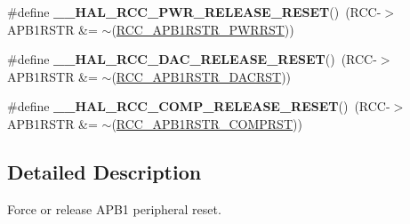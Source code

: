 \begin{DoxyCompactItemize}
\item 
\hypertarget{group___r_c_c___a_p_b1___force___release___reset_gaaa5a340d38d50e508243f48bbb47dd32}{\#define {\bfseries \-\_\-\-\_\-\-H\-A\-L\-\_\-\-R\-C\-C\-\_\-\-P\-W\-R\-\_\-\-R\-E\-L\-E\-A\-S\-E\-\_\-\-R\-E\-S\-E\-T}()~(R\-C\-C-\/$>$A\-P\-B1\-R\-S\-T\-R \&= $\sim$(\hyperlink{group___peripheral___registers___bits___definition_ga274d8cb48f0e89831efabea66d64af2a}{R\-C\-C\-\_\-\-A\-P\-B1\-R\-S\-T\-R\-\_\-\-P\-W\-R\-R\-S\-T}))}\label{group___r_c_c___a_p_b1___force___release___reset_gaaa5a340d38d50e508243f48bbb47dd32}

\item 
\hypertarget{group___r_c_c___a_p_b1___force___release___reset_ga1ac476b29c9395378bc16a7c4df08c7c}{\#define {\bfseries \-\_\-\-\_\-\-H\-A\-L\-\_\-\-R\-C\-C\-\_\-\-D\-A\-C\-\_\-\-R\-E\-L\-E\-A\-S\-E\-\_\-\-R\-E\-S\-E\-T}()~(R\-C\-C-\/$>$A\-P\-B1\-R\-S\-T\-R \&= $\sim$(\hyperlink{group___peripheral___registers___bits___definition_ga7fb9c125237cfe5b6436ca795e7f3564}{R\-C\-C\-\_\-\-A\-P\-B1\-R\-S\-T\-R\-\_\-\-D\-A\-C\-R\-S\-T}))}\label{group___r_c_c___a_p_b1___force___release___reset_ga1ac476b29c9395378bc16a7c4df08c7c}

\item 
\hypertarget{group___r_c_c___a_p_b1___force___release___reset_ga0f9a57b2f58c3ed9799d5af0393f0462}{\#define {\bfseries \-\_\-\-\_\-\-H\-A\-L\-\_\-\-R\-C\-C\-\_\-\-C\-O\-M\-P\-\_\-\-R\-E\-L\-E\-A\-S\-E\-\_\-\-R\-E\-S\-E\-T}()~(R\-C\-C-\/$>$A\-P\-B1\-R\-S\-T\-R \&= $\sim$(\hyperlink{group___peripheral___registers___bits___definition_ga8895a90782d329bed4152b0bcf8266f7}{R\-C\-C\-\_\-\-A\-P\-B1\-R\-S\-T\-R\-\_\-\-C\-O\-M\-P\-R\-S\-T}))}\label{group___r_c_c___a_p_b1___force___release___reset_ga0f9a57b2f58c3ed9799d5af0393f0462}

\end{DoxyCompactItemize}


\subsection{Detailed Description}
Force or release A\-P\-B1 peripheral reset. 